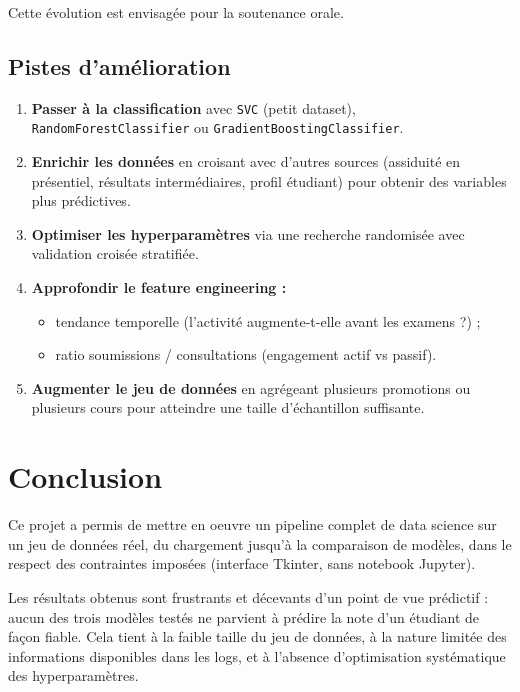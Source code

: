 \documentclass[12pt, a4paper, french]{report}
\begin{document}
\noindent Cette évolution est envisagée pour la soutenance orale.

\section{Pistes d'amélioration}

\begin{enumerate}
  \item \textbf{Passer à la classification} avec \texttt{SVC} (petit dataset), \texttt{RandomForestClassifier} ou \texttt{GradientBoostingClassifier}.

  \item \textbf{Enrichir les données} en croisant avec d'autres sources (assiduité en présentiel, résultats intermédiaires, profil étudiant) pour obtenir des variables plus prédictives.

  \item \textbf{Optimiser les hyperparamètres} via une recherche randomisée avec validation croisée stratifiée.

  \item \textbf{Approfondir le feature engineering :}
        \begin{itemize}
          \item tendance temporelle (l'activité augmente-t-elle avant les examens ?) ;
          \item ratio soumissions / consultations (engagement actif vs passif).
        \end{itemize}

  \item \textbf{Augmenter le jeu de données} en agrégeant plusieurs promotions ou plusieurs cours pour atteindre une taille d'échantillon suffisante.
\end{enumerate}

\chapter*{Conclusion}

Ce projet a permis de mettre en oeuvre un pipeline complet de data science sur un jeu de données réel, du chargement jusqu'à la comparaison de modèles, dans le respect des contraintes imposées (interface Tkinter, sans notebook Jupyter).

Les résultats obtenus sont frustrants et décevants d'un point de vue prédictif : aucun des trois modèles testés ne parvient à prédire la note d'un étudiant de façon fiable. Cela tient à la faible taille du jeu de données, à la nature limitée des informations disponibles dans les logs, et à l'absence d'optimisation systématique des hyperparamètres.
\end{document}
